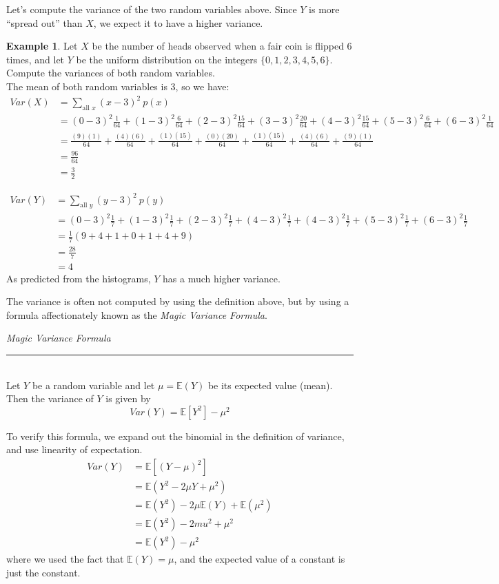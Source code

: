 \documentclass[12pt]{article}
\theoremstyle{definition}
\newtheorem*{example}{Example}
\theoremstyle{remark}
\def\E{{\mathbb E}}
\begin{document}
Let's compute the variance of the two random variables above. Since $Y$ is more ``spread out'' than $X$, we expect it to have a higher variance.

\begin{example}Let $X$ be the number of heads observed when a fair coin is flipped 6 times, and let $Y$ be the uniform distribution on the integers $\{0, 1, 2, 3, 4, 5, 6\}$. Compute the variances of both random variables.\\

The mean of both random variables is 3, so we have:
\begin{align*}
Var(X) &= \sum_{\text{all }x}(x - 3)^2 \:p(x) \\
&= (0-3)^2 \frac{1}{64} + (1-3)^2 \frac{6}{64} + (2-3)^2 \frac{15}{64} + (3-3)^2 \frac{20}{64} + (4-3)^2 \frac{15}{64} + (5-3)^2 \frac{6}{64} + (6-3)^2 \frac{1}{64} \\
&= \frac{(9)(1)}{64} + \frac{(4)(6)}{64} + \frac{(1)(15)}{64} + \frac{(0)(20)}{64} + \frac{(1)(15)}{64} + \frac{(4)(6)}{64} + \frac{(9)(1)}{64} \\ 
&= \frac{96}{64} \\
&= \frac{3}{2}
\end{align*}

\begin{align*}
Var(Y) &= \sum_{\text{all }y}(y - 3)^2 \:p(y) \\
&= (0-3)^2 \frac{1}{7} + (1-3)^2 \frac{1}{7} + (2-3)^2 \frac{1}{7} + (4-3)^2 \frac{1}{7} + (4-3)^2 \frac{1}{7} + (5-3)^2 \frac{1}{7} + (6-3)^2 \frac{1}{7} \\
&= \frac{1}{7}(9 + 4 + 1 + 0 + 1 + 4 + 9) \\
&= \frac{28}{7} \\
&= 4
\end{align*}
As predicted from the histograms, $Y$ has a much higher variance.
\end{example}

The variance is often not computed by using the definition above, but by using a formula affectionately known as the \emph{Magic Variance Formula}.

\begin{framed}
  \emph{Magic Variance Formula}\\
  \rule{\dimexpr{}\fboxrule}{.1pt} \\
Let $Y$ be a random variable and let $\mu = \E(Y)$ be its expected value (mean). Then the variance of $Y$ is given by
\[
Var(Y) = \E[ Y^2 ] - \mu^2
\]
\end{framed}
To verify this formula, we expand out the binomial in the definition of variance, and use linearity of expectation.
\begin{align*}
Var(Y) &= \E[ (Y - \mu)^2] \\
&= \E( Y^2 - 2 \mu Y + \mu^2 ) \\
&= \E(Y^2) - 2 \mu \E(Y) + \E(\mu^2) \\
&= \E(Y^2) - 2 mu^2 + \mu^2 \\
&= \E(Y^2) - \mu^2
\end{align*}
where we used the fact that $\E(Y) = \mu$, and the expected value of a constant is just the constant.\\
\end{document}
